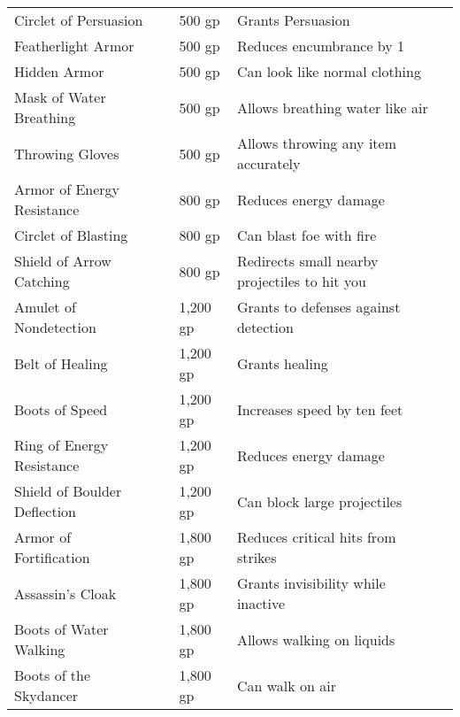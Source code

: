 \begin{longtabuwrapper}
\begin{longtabu}{l l l X l}
Circlet of Persuasion &  & 500 gp & Grants  Persuasion & \pageref{item:Circlet of Persuasion} \\
Featherlight Armor &  & 500 gp & Reduces encumbrance by 1 & \pageref{item:Featherlight Armor} \\
Hidden Armor &  & 500 gp & Can look like normal clothing & \pageref{item:Hidden Armor} \\
Mask of Water Breathing &  & 500 gp & Allows breathing water like air & \pageref{item:Mask of Water Breathing} \\
Throwing Gloves &  & 500 gp & Allows throwing any item accurately & \pageref{item:Throwing Gloves} \\
Armor of Energy Resistance &  & 800 gp & Reduces energy damage & \pageref{item:Armor of Energy Resistance} \\
Circlet of Blasting &  & 800 gp & Can blast foe with fire & \pageref{item:Circlet of Blasting} \\
Shield of Arrow Catching &  & 800 gp & Redirects small nearby projectiles to hit you & \pageref{item:Shield of Arrow Catching} \\
Amulet of Nondetection &  & 1,200 gp & Grants  to defenses against detection & \pageref{item:Amulet of Nondetection} \\
Belt of Healing &  & 1,200 gp & Grants healing & \pageref{item:Belt of Healing} \\
Boots of Speed &  & 1,200 gp & Increases speed by ten feet & \pageref{item:Boots of Speed} \\
Ring of Energy Resistance &  & 1,200 gp & Reduces energy damage & \pageref{item:Ring of Energy Resistance} \\
Shield of Boulder Deflection &  & 1,200 gp & Can block large projectiles & \pageref{item:Shield of Boulder Deflection} \\
Armor of Fortification &  & 1,800 gp & Reduces critical hits from strikes & \pageref{item:Armor of Fortification} \\
Assassin's Cloak &  & 1,800 gp & Grants invisibility while inactive & \pageref{item:Assassin's Cloak} \\
Boots of Water Walking &  & 1,800 gp & Allows walking on liquids & \pageref{item:Boots of Water Walking} \\
Boots of the Skydancer &  & 1,800 gp & Can walk on air & \pageref{item:Boots of the Skydancer} \\

\end{longtabu}
\end{longtabuwrapper}
